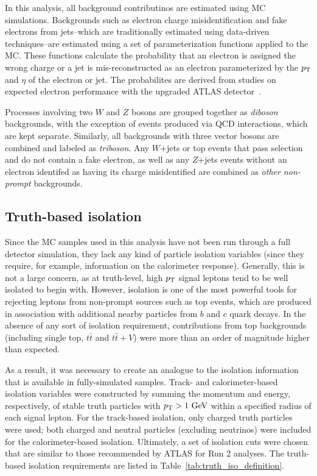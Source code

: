 In this analysis, all background contributinos are estimated using MC simulations.
Backgrounds such as electron charge misidentification and fake electrons from jets--which are traditionally estimated using data-driven techniques--are estimated using a set of parameterization functions applied to the MC.
These functions calculate the probability that an electron is assigned the wrong charge or a jet is mis-reconstructed as an electron parameterized by the $p_{\mathrm{T}}$ and $\eta$ of the electron or jet.
The probabilites are derived from studies on expected electron performance with the upgraded ATLAS detector~\cite{2016.upgrade-electron-performance}.

Processes involving two $W$ and $Z$ bosons are grouped together as \emph{diboson} backgrounds, with the exception of \ssww events produced via QCD interactions, which are kept separate.
Similarly, all backgrounds with three vector bosons are combined and labeled as \emph{triboson}.
Any $W$+jets or top events that pass selection and do not contain a fake electron, as well as any $Z$+jets events without an electron identifed as having its charge misidentified are combined as \emph{other non-prompt} backgrounds.

\subsection{Truth-based isolation}\label{sswwupgrade:isolation}
Since the MC samples used in this analysis have not been run through a full detector simulation, they lack any kind of particle isolation variables (since they require, for example, information on the calorimeter response).
Generally, this is not a large concern, as at truth-level, high $p_{\mathrm{T}}$ signal leptons tend to be well isolated to begin with.
However, isolation is one of the most powerful tools for rejecting leptons from non-prompt sources such as top events, which are produced in association with additional nearby particles from $b$ and $c$ quark decays.
In the absence of any sort of isolation requirement, contributions from top backgrounds (including single top, $t\bar{t}$ and $t\bar{t}+V$) were more than an order of magnitude higher than expected.

As a result, it was necessary to create an analogue to the isolation information that is available in fully-simulated samples.
Track- and calorimeter-based isolation variables were constructed by summing the momentum and energy, respectively, of stable truth particles with $p_{\mathrm{T}} > 1~\textrm{GeV}$ within a specified radius of each signal lepton.
For the track-based isolation, only charged truth particles were used; both charged and neutral particles (excluding neutrinos) were included for the calorimeter-based isolation.
Ultimately, a set of isolation cuts were chosen that are similar to those recommended by ATLAS for Run 2 analyses.
The truth-based isolation requirements are listed in Table~\ref{tab:truth_iso_definition}.

